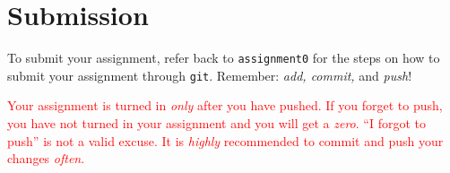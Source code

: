 \documentclass[11pt]{article}
\begin{document}

\section{Submission}

To submit your assignment, refer back to \texttt{assignment0} for
the steps on how to submit your assignment through \texttt{git}.
Remember: \emph{add, commit,} and \emph{push}!

\textcolor{red}{Your assignment is turned in \emph{only} after you
have pushed.  If you forget to push, you have not turned in your
assignment and you will get a \emph{zero}. ``I forgot to push'' is
not a valid excuse. It is \emph{highly} recommended to commit and
push your changes \emph{often}.}
\end{document}
